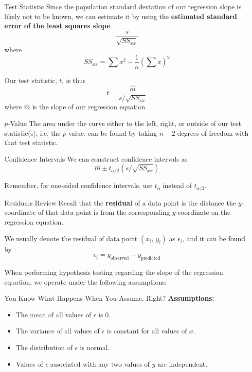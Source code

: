 \documentclass[t]{beamer}
\begin{document}
\begin{frame}{Test Statistic}
Since the population standard deviation of our regression slope is likely not to be known, we can estimate it by using the {\color{blue}\textbf{estimated standard error of the least squares slope}}.	\pause
\[
\frac{s}{\sqrt{SS_{xx}}}
\]
where 
\[
SS_{xx} = \sum x^2 - \frac{1}{n}\left(\sum x\right)^2
\]
\pause

Our test statistic, $t$, is thus
\[
t = \frac{\hat{m}}{s/\sqrt{SS_{xx}}}
\]
where $\hat{m}$ is the slope of our regression equation.
\end{frame}

\begin{frame}{$p$-Value}
The area under the curve either to the left, right, or outside of our test statistic(s), i.e. the $p$-value, can be found by taking $n-2$ degrees of freedom with that test statistic.
\end{frame}

\begin{frame}{Confidence Intervals}
We can construct confidence intervals as
\[
\hat{m} \pm t_{\alpha/2}\left(s/\sqrt{SS_{xx}}\right)
\]
\pause

Remember, for one-sided confidence intervals, use $t_{\alpha}$ instead of $t_{\alpha/2}$.
\end{frame}

\begin{frame}{Residuals Review}
Recall that the {\color{blue}\textbf{residual}} of a data point is the distance the $y$-coordinate of that data point is from the corresponding $y$-coordinate on the regression equation. \newline\\	\pause

We usually denote the residual of data point $(x_i, \, y_i)$ as $\epsilon_i$, and it can be found by 
\[
\epsilon_i = y_{\text{observed}} - y_{\text{predicted}}
\]
\pause

When performing hypothesis testing regarding the slope of the regression equation, we operate under the following assumptions:
\end{frame}

\begin{frame}{You Know What Happens When You Assume, Right?}
\textbf{Assumptions:}
\begin{itemize}
	\item<2-> The mean of all values of $\epsilon$ is 0.
	\item<3-> The variance of all values of $\epsilon$ is constant for all values of $x$.
	\item<4-> The distribution of $\epsilon$ is normal.
	\item<5-> Values of $\epsilon$ associated with any two values of $y$ are independent.
\end{itemize}
\end{frame}



\end{document}
